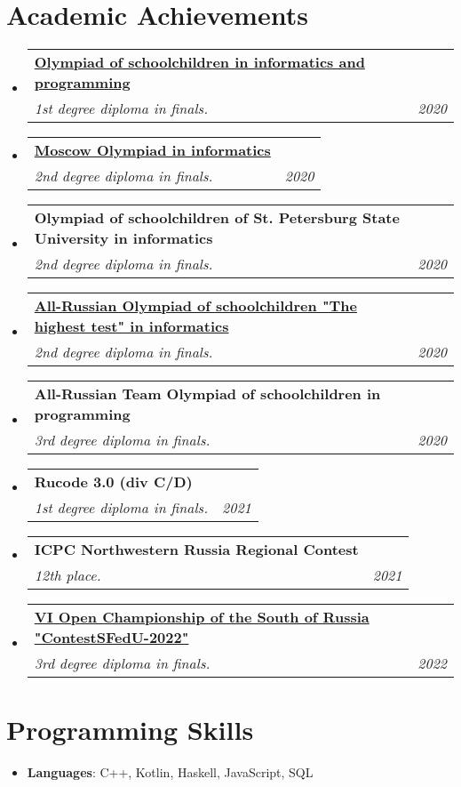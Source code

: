 \documentclass[letterpaper,11pt]{article}
\makeatletter
\newcommand{\resumeSubheading}[4]{
  \vspace{-1pt}\item
    \begin{tabular*}{0.97\textwidth}{l@{\extracolsep{\fill}}r}
      \textbf{#1} & #2 \\
      \textit{\small#3} & \textit{\small #4} \\
    \end{tabular*}\vspace{-5pt}
}
\newcommand{\resumeSubHeadingListStart}{\begin{itemize}[leftmargin=*]}
\newcommand{\resumeSubHeadingListEnd}{\end{itemize}}
\makeatother
\begin{document}
\section{Academic Achievements}
  \resumeSubHeadingListStart
    \resumeSubheading{\href{https://neerc.ifmo.ru/school/ioip/standings-2020.html}{Olympiad of schoolchildren in informatics and programming}}{}
    {1st degree diploma in finals.}{2020}
    \resumeSubheading{\href{https://mos-inf.olimpiada.ru/winners10-11-2020}{Moscow Olympiad in informatics}}{}
    {2nd degree diploma in finals.}{2020}
    \resumeSubheading{Olympiad of schoolchildren of St. Petersburg
State University in informatics}{}
    {2nd degree diploma in finals.}{2020}
    \resumeSubheading{\href{https://olymp.hse.ru/data/2020/04/03/1556029378/\%D0\%98\%D0\%BD\%D1\%84\%D0\%BE\%D1\%80\%D0\%BC\%D0\%B0\%D1\%82\%D0\%B8\%D0\%BA\%D0\%B0\%2011.pdf}{All-Russian Olympiad of schoolchildren "The highest test" in informatics}}{}
    {2nd degree diploma in finals.}{2020}
    \resumeSubheading{All-Russian Team Olympiad of schoolchildren in programming}{}
    {3rd degree diploma in finals.}{2020}
    \resumeSubheading{Rucode 3.0 (div C/D)}{}
    {1st degree diploma in finals.}{2021}
    \resumeSubheading{ICPC Northwestern Russia Regional Contest}{}
    {12th place.}{2021}
    \resumeSubheading{\href{https://drive.google.com/file/d/1dGPclqfhc_l4tnlMMRX_VPl1Qzo_12aD/view}{VI Open Championship of the South of Russia "ContestSFedU-2022"}}{}
    {3rd degree diploma in finals.}{2022}
  \resumeSubHeadingListEnd

\section{Programming Skills}
  \resumeSubHeadingListStart
    \item{
      \textbf{Languages}{: C++, Kotlin, Haskell, JavaScript, SQL }
    }
  \resumeSubHeadingListEnd


\end{document}
